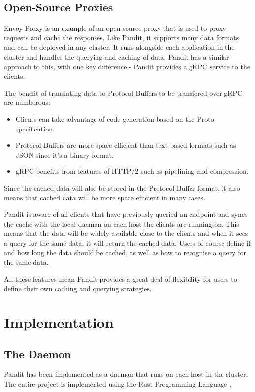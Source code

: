 \documentclass{article}
\begin{document}
\subsection{Open-Source Proxies}
Envoy Proxy \cite{envoy} is an example of an open-source proxy that is used to proxy requests and cache the responses.
Like Pandit, it supports many data formats and can be deployed in any cluster.
It runs alongside each application in the cluster and handles the querying and caching of data.
Pandit has a similar approach to this, with one key difference - Pandit provides a gRPC service to the clients.

The benefit of translating data to Protocol Buffers to be transfered over gRPC are numberous:
\begin{itemize}
    \item Clients can take advantage of code generation based on the Proto specification. \cite{codegen}
    \item Protocol Buffers are more space efficient than text based formats such as JSON since it's a binary format. \cite{encoding}
    \item gRPC benefits from features of HTTP/2 such as pipelining and compression. \cite{http2}
\end{itemize}

Since the cached data will also be stored in the Protocol Buffer format, it also means that cached data will be more space efficient in
many cases.

Pandit is aware of all clients that have previously queried an endpoint and syncs the cache with the local daemon on each host the clients are running on.
This means that the data will be widely available close to the clients and when it sees a query for the same data, it will return the cached data.
Users of course define if and how long the data should be cached, as well as how to recognise a query for the same data.

All these features mean Pandit provides a great deal of flexibility for users to define their own caching and querying strategies.

\section{Implementation}
\subsection{The Daemon}
Pandit has been implemented as a daemon that runs on each host in the cluster.
The entire project is implemented using the Rust Programming Language \cite{rust},
\end{document}
